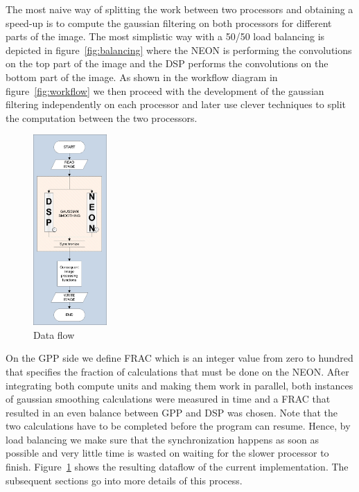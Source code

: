 The most naive way of splitting the work between two processors and obtaining a speed-up is to compute the gaussian filtering on both processors for different parts of the image. The most simplistic way with a 50/50 load balancing is depicted in figure~\ref{fig:balancing} where the NEON is performing the convolutions on the top part of the image and the DSP performs the convolutions on the bottom part of the image. As shown in the workflow diagram in figure~\ref{fig:workflow} we then proceed with the development of the gaussian filtering independently on each processor and later use clever techniques to split the computation between the two processors.


\begin{figure}
\centering
\includegraphics[width=0.25\textwidth]{drawings/model}
\caption{Data flow}
\label{fig:dataflow}
\end{figure}


On the GPP side we define FRAC which is an integer value from zero to hundred that specifies the fraction of calculations that must be done on the NEON. After integrating both compute units and making them work in parallel, both instances of gaussian smoothing calculations were measured in time and a FRAC that resulted in an even balance between GPP and DSP was chosen. Note that the two calculations have to be completed before the program can resume.
Hence, by load balancing we make sure that the synchronization happens as soon as possible and very little time is wasted on waiting for the slower processor to finish. Figure~\ref{fig:dataflow} shows the resulting dataflow of the current implementation. The subsequent sections go into more details of this process.




